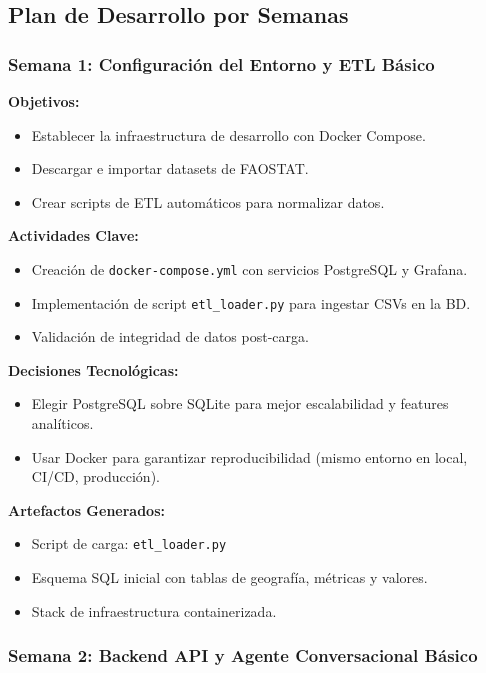 \documentclass[11pt, a4paper]{report}
\begin{document}
\subsection{Plan de Desarrollo por Semanas}

\subsubsection{Semana 1: Configuración del Entorno y ETL Básico}

\textbf{Objetivos:}
\begin{itemize}
    \item Establecer la infraestructura de desarrollo con Docker Compose.
    \item Descargar e importar datasets de FAOSTAT.
    \item Crear scripts de ETL automáticos para normalizar datos.
\end{itemize}

\textbf{Actividades Clave:}
\begin{itemize}
    \item Creación de \texttt{docker-compose.yml} con servicios PostgreSQL y Grafana.
    \item Implementación de script \texttt{etl\_loader.py} para ingestar CSVs en la BD.
    \item Validación de integridad de datos post-carga.
\end{itemize}

\textbf{Decisiones Tecnológicas:}
\begin{itemize}
    \item Elegir PostgreSQL sobre SQLite para mejor escalabilidad y features analíticos.
    \item Usar Docker para garantizar reproducibilidad (mismo entorno en local, CI/CD, producción).
\end{itemize}

\textbf{Artefactos Generados:}
\begin{itemize}
    \item Script de carga: \texttt{etl\_loader.py}
    \item Esquema SQL inicial con tablas de geografía, métricas y valores.
    \item Stack de infraestructura containerizada.
\end{itemize}

\subsubsection{Semana 2: Backend API y Agente Conversacional Básico}
\end{document}
